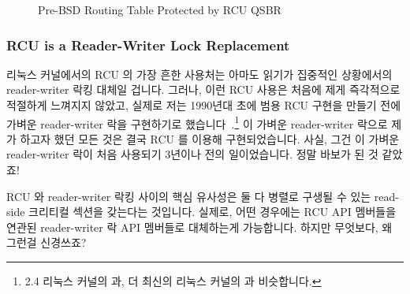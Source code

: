 \begin{figure}[tb]
\centering
{}
\caption{Pre-BSD Routing Table Protected by RCU QSBR}
\label{fig:defer:Pre-BSD Routing Table Protected by RCU QSBR}
\end{figure}

\subsubsection{RCU is a Reader-Writer Lock Replacement}
\label{sec:defer:RCU is a Reader-Writer Lock Replacement}

리눅스 커널에서의 RCU 의 가장 흔한 사용처는 아마도 읽기가 집중적인 상황에서의
reader-writer 락킹 대체일 겁니다.
그러나, 이런 RCU 사용은 처음에 제게 즉각적으로 적절하게 느껴지지 않았고, 실제로
저는 1990년대 초에 범용 RCU 구현을 만들기 전에 가벼운 reader-writer 락을
구현하기로 했습니다~\cite{WilsonCHsieh92a}.\footnote{
	2.4 리눅스 커널의  과, 더 최신의 리눅스 커널의 
	과 비슷합니다.}
이 가벼운 reader-writer 락으로 제가 하고자 했던 모든 것은 결국 RCU 를 이용해
구현되었습니다.
사실, 그건 이 가벼운 reader-writer 락이 처음 사용되기 3년이나 전의
일이었습니다.
정말 바보가 된 것 같았죠!

RCU 와 reader-writer 락킹 사이의 핵심 유사성은 둘 다 병렬로 구생될 수 있는
read-side 크리티컬 섹션을 갖는다는 것입니다.
실제로, 어떤 경우에는 RCU API 멤버들을 연관된 reader-writer 락 API 멤버들로
대체하는게 가능합니다.
하지만 무엇보다, 왜 그런걸 신경쓰죠?

